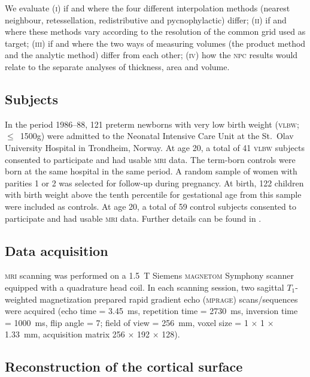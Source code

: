 We evaluate (\textsc{i}) if and where the four different interpolation methods (nearest neighbour, retessellation, redistributive and pycnophylactic) differ; (\textsc{ii}) if and where these methods vary according to the resolution of the common grid used as target; (\textsc{iii}) if and where the two ways of measuring volumes (the product method and the analytic method) differ from each other; (\textsc{iv}) how the \textsc{npc} results would relate to the separate analyses of thickness, area and volume.

\subsection{Subjects}

In the period 1986--88, 121 preterm newborns with very low birth weight (\textsc{vlbw}; $\leqslant$~1500g) were admitted to the Neonatal Intensive Care Unit at the St.\ Olav University Hospital in Trondheim, Norway. At age 20, a total of 41 \textsc{vlbw} subjects consented to participate and had usable \textsc{mri} data. The term-born controls were born at the same hospital in the same period. A random sample of women with parities 1 or 2 was selected for follow-up during pregnancy. At birth, 122 children with birth weight above the tenth percentile for gestational age from this sample were included as controls. At age 20, a total of 59 control subjects consented to participate and had usable \textsc{mri} data. Further details can be found in \citet{Martinussen2005, Skranes2007}.

\subsection{Data acquisition}

\textsc{mri} scanning was performed on a 1.5~T Siemens \textsc{magnetom} Symphony scanner equipped with a quadrature head coil. In each scanning session, two sagittal $T_1$-weighted magnetization prepared rapid gradient echo (\textsc{mprage}) scans/sequences were acquired (echo time = 3.45~ms, repetition time = 2730~ms, inversion time = 1000~ms, flip angle = 7\degree; field of view = 256~mm, voxel size = 1 $\times$ 1 $\times$ 1.33~mm, acquisition matrix 256 $\times$ 192 $\times$ 128).  

\subsection{Reconstruction of the cortical surface}

